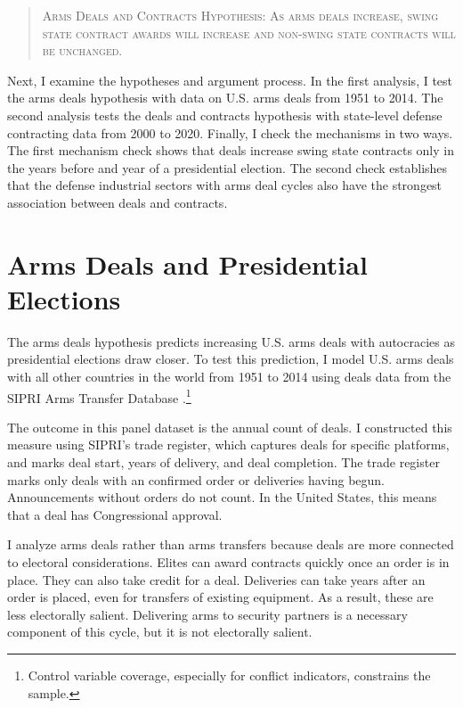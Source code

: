 \documentclass[12pt]{article}
\begin{document}
\begin{quote}
\textsc{Arms Deals and Contracts Hypothesis: As arms deals increase, swing state contract awards will increase and non-swing state contracts will be unchanged.}
\end{quote}


Next, I examine the hypotheses and argument process. 
In the first analysis, I test the arms deals hypothesis with data on U.S. arms deals from 1951 to 2014.  
The second analysis tests the deals and contracts hypothesis with state-level defense contracting data from 2000 to 2020. 
Finally, I check the mechanisms in two ways.
The first mechanism check shows that deals increase swing state contracts only in the years before and year of a presidential election. 
The second check establishes that the defense industrial sectors with arms deal cycles also have the strongest association between deals and contracts. 


\section{Arms Deals and Presidential Elections}


The arms deals hypothesis predicts increasing U.S. arms deals with autocracies as presidential elections draw closer.
To test this prediction, I model U.S. arms deals with all other countries in the world from 1951 to 2014 using deals data from the SIPRI Arms Transfer Database \citep{SIPRI2021}.\footnote{Control variable coverage, especially for conflict indicators, constrains the sample.}



The outcome in this panel dataset is the annual count of deals.
I constructed this measure using SIPRI's trade register, which captures deals for specific platforms, and marks deal start, years of delivery, and deal completion.
The trade register marks only deals with an confirmed order or deliveries having begun. 
Announcements without orders do not count. 
In the United States, this means that a deal has Congressional approval.


I analyze arms deals rather than arms transfers because deals are more connected to electoral considerations.
Elites can award contracts quickly once an order is in place.
They can also take credit for a deal. 
Deliveries can take years after an order is placed, even for transfers of existing equipment. 
As a result, these are less electorally salient. 
Delivering arms to security partners is a necessary component of this cycle, but it is not electorally salient. 
\end{document}
